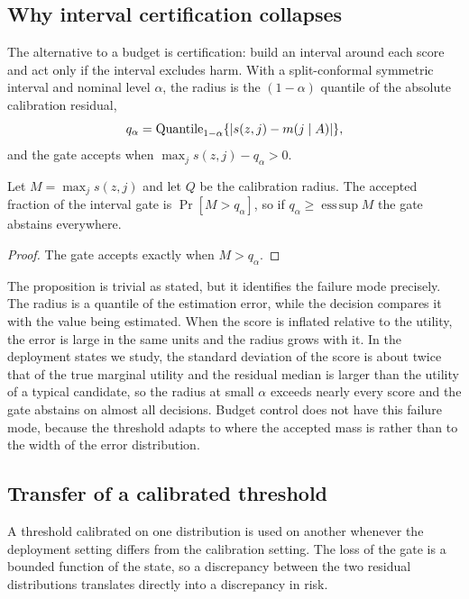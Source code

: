 \subsection{Why interval certification collapses}

The alternative to a budget is certification: build an interval around each
score and act only if the interval excludes harm. With a split-conformal
symmetric interval and nominal level $\alpha$, the radius is the
$(1-\alpha)$ quantile of the absolute calibration residual,
\begin{equation}
 q_\alpha=\operatorname{Quantile}_{1-\alpha}\{|s(z,j)-m(j\mid A)|\},
 \label{eq:radius}
\end{equation}
and the gate accepts when $\max_j s(z,j)-q_\alpha>0$.

\begin{proposition}
\label{prop:interval}
Let $M=\max_j s(z,j)$ and let $Q$ be the calibration radius. The accepted
fraction of the interval gate is $\Pr[M>q_\alpha]$, so if $q_\alpha\ge
\operatorname{ess\,sup}M$ the gate abstains everywhere.
\end{proposition}

\begin{proof}
The gate accepts exactly when $M>q_\alpha$.
\end{proof}

The proposition is trivial as stated, but it identifies the failure mode
precisely. The radius is a quantile of the estimation error, while the
decision compares it with the value being estimated. When the score is
inflated relative to the utility, the error is large in the same units and the
radius grows with it. In the deployment states we study, the standard
deviation of the score is about twice that of the true marginal utility and
the residual median is larger than the utility of a typical candidate, so the
radius at small $\alpha$ exceeds nearly every score and the gate abstains on
almost all decisions. Budget control does not have this failure mode, because
the threshold adapts to where the accepted mass is rather than to the width of
the error distribution.

\subsection{Transfer of a calibrated threshold}

A threshold calibrated on one distribution is used on another whenever the
deployment setting differs from the calibration setting. The loss of the gate
is a bounded function of the state, so a discrepancy between the two residual
distributions translates directly into a discrepancy in risk.

